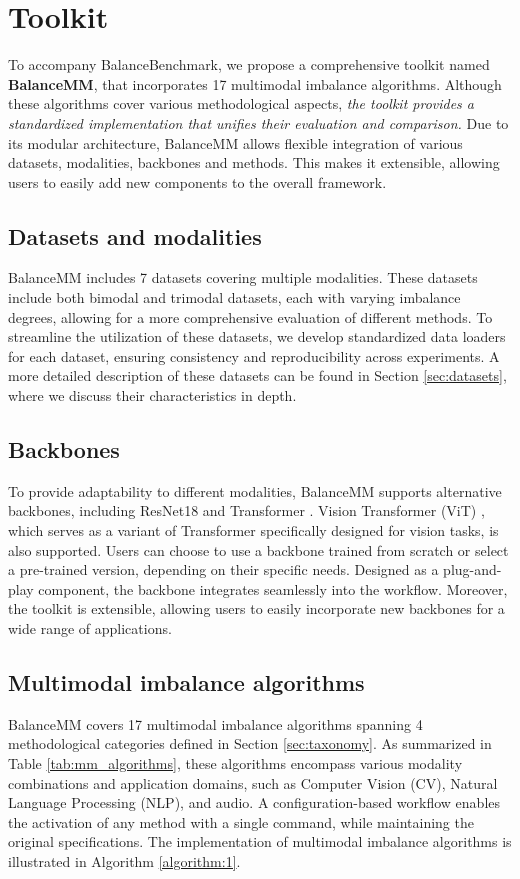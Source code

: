 \vspace{-5pt}
\section{Toolkit}
\label{sec:tool}
To accompany BalanceBenchmark, we propose a comprehensive toolkit named \textbf{BalanceMM}, that incorporates 17 multimodal imbalance algorithms. Although these algorithms cover various methodological aspects, \textit{the toolkit provides a standardized implementation that unifies their evaluation and comparison.} Due to its modular architecture, BalanceMM allows flexible integration of various datasets, modalities, backbones and methods. This makes it extensible, allowing users to easily add new components to the overall framework. 

\subsection{Datasets and modalities} \label{sec:tool1}
BalanceMM includes 7 datasets covering multiple modalities. These datasets include both bimodal and trimodal datasets, each with varying imbalance degrees, allowing for a more comprehensive evaluation of different methods. To streamline the utilization of these datasets, we develop standardized data loaders for each dataset, ensuring consistency and reproducibility across experiments. A more detailed description of these datasets can be found in Section \ref{sec:datasets}, where we discuss their characteristics in depth.

\subsection{Backbones} \label{sec:tool2}
To provide adaptability to different modalities, BalanceMM supports alternative backbones, including ResNet18 \cite{ResNet} and Transformer \cite{Transformer}. Vision Transformer (ViT) \cite{ViT}, which serves as a variant of Transformer specifically designed for vision tasks, is also supported. Users can choose to use a backbone trained from scratch or select a pre-trained version, depending on their specific needs. Designed as a plug-and-play component, the backbone integrates seamlessly into the workflow. Moreover, the toolkit is extensible, allowing users to easily incorporate new backbones for a wide range of applications.

\subsection{Multimodal imbalance algorithms} \label{sec:tool3}
BalanceMM covers 17 multimodal imbalance algorithms spanning 4 methodological categories defined in Section \ref{sec:taxonomy}. As summarized in Table \ref{tab:mm_algorithms}, these algorithms encompass various modality combinations and application domains, such as Computer Vision (CV), Natural Language Processing (NLP), and audio. A configuration-based workflow enables the activation of any method with a single command, while maintaining the original specifications. The implementation of multimodal imbalance algorithms is illustrated in Algorithm \ref{algorithm:1}.


